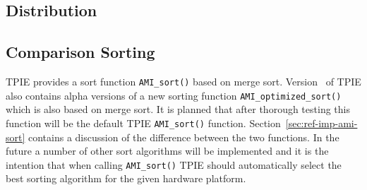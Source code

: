 


\subsection{Distribution}
\label{sec:ref-ami-dist}

\tobewritten


\subsection{Comparison Sorting}
\label{sec:ref-ami-sort}

TPIE provides a sort function \verb|AMI_sort()| based on merge
sort. Version \version~of TPIE also contains alpha versions of a new
sorting function \verb|AMI_optimized_sort()| which is also based on merge
sort. It is planned that after thorough testing this function will be the
default TPIE \verb|AMI_sort()| function. Section~\ref{sec:ref-imp-ami-sort}
contains a discussion of the difference between the two functions. In the
future a number of other sort algorithms will be implemented and it is the
intention that when calling \verb|AMI_sort()| TPIE should automatically
select the best sorting algorithm for the given hardware platform.


